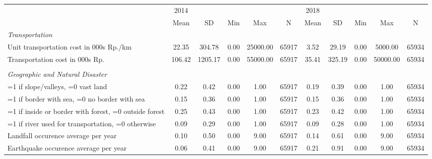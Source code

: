 \begin{tabular}{l*{2}{ccccc}}
\toprule
                &     2014&         &         &         &         &     2018&         &         &         &         \\
                &     Mean&       SD&      Min&      Max&        N&     Mean&       SD&      Min&      Max&        N\\
\midrule
\emph{Transportation}&         &         &         &         &         &         &         &         &         &         \\
\hspace{0.25cm} Unit transportation cost in 000s Rp./km&    22.35&   304.78&     0.00& 25000.00&    65917&     3.52&    29.19&     0.00&  5000.00&    65934\\
\hspace{0.25cm} Transportation cost in 000s Rp.&   106.42&  1205.17&     0.00& 55000.00&    65917&    35.41&   325.19&     0.00& 50000.00&    65934\\
\vspace{0.1em} \\ \emph{Geographic and Natural Disaster}&         &         &         &         &         &         &         &         &         &         \\
\hspace{0.25cm} =1 if slope/valleys, =0 vast land&     0.22&     0.42&     0.00&     1.00&    65917&     0.19&     0.39&     0.00&     1.00&    65934\\
\hspace{0.25cm} =1 if border with sea, =0 no border with sea&     0.15&     0.36&     0.00&     1.00&    65917&     0.15&     0.36&     0.00&     1.00&    65934\\
\hspace{0.25cm} =1 if inside or border with forest, =0 outside forest&     0.25&     0.43&     0.00&     1.00&    65917&     0.23&     0.42&     0.00&     1.00&    65934\\
\hspace{0.25cm} =1 if river used for transportation, =0 otherwise&     0.09&     0.29&     0.00&     1.00&    65917&     0.09&     0.28&     0.00&     1.00&    65934\\
\hspace{0.25cm} Landfall occurence average per year&     0.10&     0.50&     0.00&     9.00&    65917&     0.14&     0.61&     0.00&     9.00&    65934\\
\hspace{0.25cm} Earthquake occurence average per year&     0.06&     0.41&     0.00&     9.00&    65917&     0.21&     0.91&     0.00&     9.00&    65934\\

\end{tabular}
